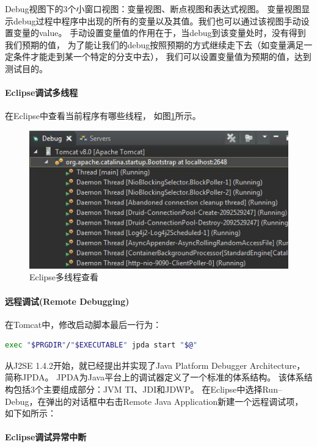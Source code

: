 \documentclass{book}
\begin{document}
Debug视图下的3个小窗口视图：变量视图、断点视图和表达式视图。
变量视图显示debug过程中程序中出现的所有的变量以及其值。我们也可以通过该视图手动设置变量的value。
手动设置变量值的作用在于，当debug到该变量处时，没有得到我们预期的值，
为了能让我们的debug按照预期的方式继续走下去（如变量满足一定条件才能走到某一个特定的分支中去），
我们可以设置变量值为预期的值，达到测试目的。

\paragraph{Eclipse调试多线程}

在Eclipse中查看当前程序有哪些线程，
如图\ref{code:EclipseMultiThreadDebugView}所示。

\begin{figure}[htbp]
	\centering
	\includegraphics[scale=0.5]{EclipseMultiThreadDebugView.jpg}
	\caption{Eclipse多线程查看}
	\label{code:EclipseMultiThreadDebugView}
\end{figure}

\paragraph{远程调试(Remote Debugging)}

在Tomcat中，修改启动脚本最后一行为：

\begin{lstlisting}[language=Bash]
exec "$PRGDIR"/"$EXECUTABLE" jpda start "$@"
\end{lstlisting}

从J2SE 1.4.2开始，就已经提出并实现了Java Platform Debugger Architecture，简称JPDA。
JPDA为Java平台上的调试器定义了一个标准的体系结构。
该体系结构包括3个主要组成部分：JVM TI、JDI和JDWP。
在Eclipse中选择Run--Debug，在弹出的对话框中右击Remote Java Application新建一个远程调试项，
如下如所示：

\paragraph{Eclipse调试异常中断}
\end{document}
